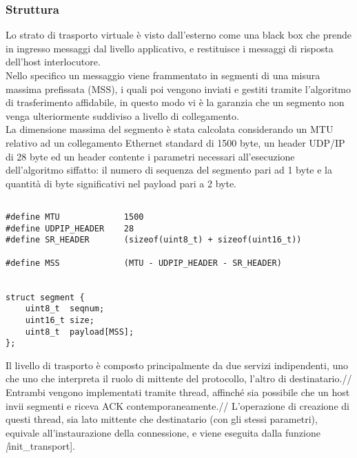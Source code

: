 \subsubsection{Struttura}
Lo strato di trasporto virtuale è visto dall'esterno come una black box che prende in ingresso messaggi dal livello applicativo, e restituisce i messaggi di risposta dell'host interlocutore.\\
Nello specifico un messaggio viene frammentato in segmenti di una misura massima prefissata (MSS), i quali poi vengono inviati e gestiti tramite l'algoritmo di trasferimento affidabile, in questo modo vi è la garanzia che un segmento non venga ulteriormente suddiviso a livello di collegamento.\\
La dimensione massima del segmento è stata calcolata considerando un MTU relativo ad un collegamento Ethernet standard di 1500 byte, un header UDP/IP di 28 byte ed un header contente i parametri necessari all'esecuzione dell'algoritmo siffatto: il numero di sequenza del segmento pari ad 1 byte e la quantità di byte significativi nel payload pari a 2 byte.


\begin{lstlisting}[title=transport.h]

#define MTU             1500
#define UDPIP_HEADER    28
#define SR_HEADER       (sizeof(uint8_t) + sizeof(uint16_t))

#define MSS             (MTU - UDPIP_HEADER - SR_HEADER)


struct segment {
	uint8_t  seqnum;
	uint16_t size;
	uint8_t  payload[MSS];
};
\end{lstlisting}

Il livello di trasporto è composto principalmente da due servizi indipendenti, uno che uno che interpreta il ruolo di mittente del protocollo, l'altro di destinatario.//
Entrambi vengono implementati tramite thread, affinché sia possibile che un host invii segmenti e riceva ACK contemporaneamente.//
L'operazione di creazione di questi thread, sia lato mittente che destinatario (con gli stessi parametri), equivale all'instaurazione della connessione,
e viene eseguita dalla funzione \emph[init\_transport].


